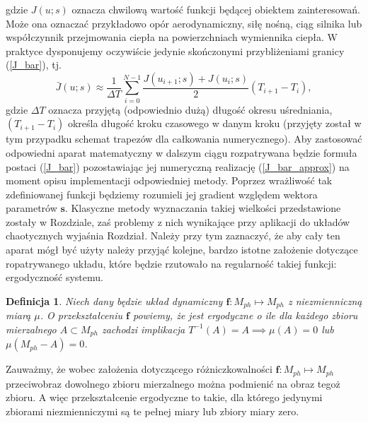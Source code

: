 \documentclass[12pt]{article}
\newtheorem{defi}{Definicja}
\begin{document}
gdzie $ J(u;s) $ oznacza chwilową wartość funkcji będącej obiektem zainteresowań. Może ona oznaczać przykładowo opór aerodynamiczny, siłę nośną, ciąg silnika lub współczynnik przejmowania ciepła na powierzchniach wymiennika ciepła. W praktyce dysponujemy oczywiście jedynie skończonymi przybliżeniami granicy (\ref{J_bar}), tj.
\begin{equation}
\bar{J}(u;s) \approx \frac{1}{\Delta T}\sum_{i=0}^{N-1}\frac{J(u_{i+1};s)+J(u_{i};s)}{2}(T_{i+1}-T_{i}),
\label{J_bar_approx}
\end{equation}
gdzie $ \Delta T $ oznacza przyjętą (odpowiednio dużą) długość okresu uśredniania,  $ (T_{i+1}-T_{i}) $ określa długość kroku czasowego w danym kroku (przyjęty został w tym przypadku schemat trapezów dla całkowania numerycznego).\newline
Aby zastosować odpowiedni aparat matematyczny w dalszym ciągu rozpatrywana będzie formuła postaci (\ref{J_bar}) pozostawiając jej numeryczną realizację (\ref{J_bar_approx}) na moment opisu implementacji odpowiedniej metody. Poprzez wrażliwość tak zdefiniowanej funkcji będziemy rozumieli jej gradient względem wektora parametrów $ \textbf{s} $. Klasyczne metody wyznaczania takiej wielkości przedstawione zostały w Rozdziale, zaś problemy z nich wynikające przy aplikacji do układów chaotycznych wyjaśnia Rozdział. Należy przy tym zaznaczyć, że aby cały ten aparat mógł być użyty należy przyjąć kolejne, bardzo istotne założenie dotyczące ropatrywanego układu, które będzie rzutowało na regularność takiej funkcji: ergodyczność systemu.
\begin{defi}\label{ergodicity}
Niech dany będzie układ dynamiczny $  \textbf{f}: M_{ph} \mapsto M_{ph}$ z niezmienniczną miarą $\mu$. O przekształceniu $  \textbf{f}$ powiemy, że jest ergodyczne o ile dla każdego zbioru mierzalnego $ A \subset M_{ph} $ zachodzi implikacja 
$ T^{-1}(A) = A  \implies \mu(A)=0$ lub $\mu(M_{ph}-A)=0$.
\end{defi} 
Zauważmy, że wobec założenia dotyczącego różniczkowalności $  \textbf{f}: M_{ph} \mapsto M_{ph}$ przeciwobraz dowolnego zbioru mierzalnego można podmienić na obraz tegoż zbioru. A więc przekształcenie ergodyczne to takie, dla którego jedynymi zbiorami niezmienniczymi są te pełnej miary lub zbiory miary zero. \newline
\end{document}
